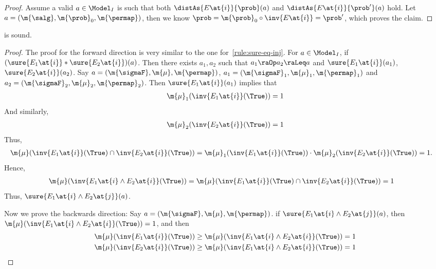 \begin{proof}
  Assume a valid $a\in\Model_I$ is such that both
  $ \distAs{E\at{i}}{\prob }(a) $ and
  $ \distAs{E\at{i}}{\prob'}(a) $
  hold.
  Let $ a = (\m{\salg}, \m{\prob}_0,\m{\permap}) $,
  then we know
  $ \prob = \m{\prob}_0 \circ \inv{E\at{i}} = \prob'$,
  which proves the claim.
\end{proof} \begin{lemma}
\label{proof:sure-merge}
   is sound.
\end{lemma}

\begin{proof}
  The proof for the forward direction is very similar to
  the one for~\cref{rule:sure-eq-inj}.
  For $a \in \Model_I$,
  if $(\sure{E_1\at{i}} \ast \sure{E_2 \at{i}})(a)$.
  Then there exists
  $a_1, a_2$ such that $a_1 \raOp a_2 \raLeq a$ and
  $\sure{E_1 \at{i}}(a_1)$,
  $\sure{E_2 \at{i}}(a_2)$.
  Say $a = (\m{\sigmaF}, \m{\mu}, \m{\permap})$,
  $a_1 = (\m{\sigmaF}_1, \m{\mu}_1, \m{\permap}_1)$
  and $a_2 = (\m{\sigmaF}_2, \m{\mu}_2, \m{\permap}_2)$.
  Then $\sure{E_1\at{i}}(a_1)$ implies that
  \begin{align*}
    \m{\mu}_1 (\inv{E_1\at{i}}(\True)) = 1
  \end{align*}
  And similarly,
  \begin{align*}
    \m{\mu}_2 (\inv{E_2\at{i} }(\True)) = 1
  \end{align*}
  Thus,
  \begin{align*}
    \m{\mu} (\inv{E_1\at{i}}(\True) \cap \inv{E_2\at{i}}(\True) )
    &= \m{\mu}_1 (\inv{E_1\at{i}}(\True))  \cdot \m{\mu}_2 (\inv{E_2\at{i}}(\True))
     = 1.
  \end{align*}
  Hence,
  \begin{align*}
    \m{\mu} (\inv{E_1\at{i} \land E_2\at{i}}(\True) )
    &= \m{\mu} (\inv{E_1\at{i}}(\True) \cap \inv{E_2\at{i}}(\True)) = 1
  \end{align*}
  Thus, $\sure{E_1\at{i} \land E_2\at{j}} (a)$.

  Now we prove the backwards direction:
  Say $a = (\m{\sigmaF}, \m{\mu}, \m{\permap})$.
  if  $\sure{E_1\at{i} \land E_2\at{j}} (a)$,
  then $\m{\mu} (\inv{E_1\at{i} \land E_2\at{i}}(\True)) = 1$,
  and then
  \begin{align*}
    \m{\mu} (\inv{E_1\at{i}}(\True))  &\geq \m{\mu} (\inv{E_1\at{i} \land E_2\at{i}}(\True)) = 1 \\
    \m{\mu} (\inv{E_2\at{i}}(\True))  &\geq \m{\mu} (\inv{E_1\at{i} \land E_2\at{i}}(\True)) = 1
  \end{align*}


\end{proof}
